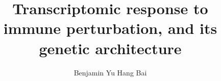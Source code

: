 \documentclass[11pt,a4paper,twoside,openright]{book}
\begin{document}

\title{Transcriptomic response to immune perturbation, and its genetic architecture}
\author{Benjamin Yu Hang Bai}
\date{\DTMnow}

%
%
\frontmatter
%
%

% 

% 


%
%
\mainmatter
 


% 


%
% 

%
%
\backmatter



\end{document}
